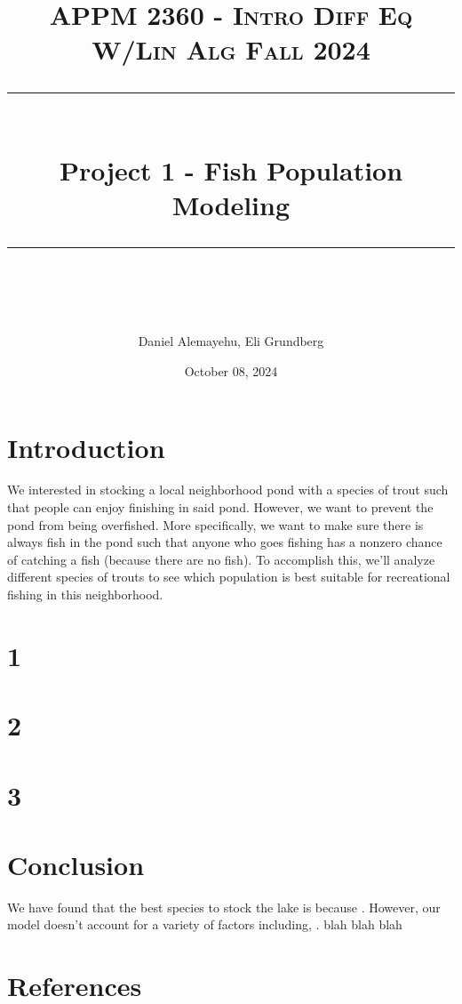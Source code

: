 \documentclass[letterpaper,12pt]{article}
\title{
\normalfont \normalsize 
\textsc{APPM 2360 - Intro Diff Eq W/Lin Alg \hfill Fall 2024} \\
[10pt] 
\rule{\linewidth}{0.5pt} \\[6pt] 
\huge Project 1 - Fish Population Modeling \\
\rule{\linewidth}{2pt}  \\[10pt]
}
\date{October 08, 2024}
\author{Daniel Alemayehu, Eli Grundberg}
\begin{document}
\begin{titlingpage}
\maketitle
\end{titlingpage}

\newpage

\section*{Introduction}
We interested in stocking a local neighborhood pond with a species of trout such that people can enjoy finishing in said pond. However, we want to prevent the pond from being overfished. More specifically, we want to make sure there is always fish in the pond such that anyone who goes fishing has a nonzero chance of catching a fish (because there are no fish). To accomplish this, we'll analyze different species of trouts to see which population is best suitable for recreational fishing in this neighborhood.
\section*{1}
\section*{2}
\section*{3} 
\section*{Conclusion}
We have found that the best species to stock the lake is \underline{\hspace{3cm}} because \underline{\hspace{3cm}}. However, our model doesn't account for a variety of factors including, \underline{\hspace{3cm}}. blah blah blah
\section*{References}
\end{document}
